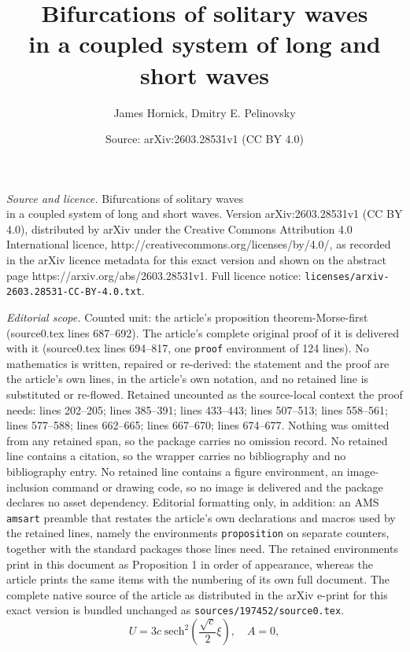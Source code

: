 \documentclass[10pt,a4paper]{amsart}
\title{Bifurcations of solitary waves \\ in a coupled system of long and short waves}
\author{James Hornick, Dmitry E. Pelinovsky}
\date{Source: arXiv:2603.28531v1 (CC BY 4.0)}
\begin{document}
\maketitle

\noindent\emph{Source and licence.} Bifurcations of solitary waves \\ in a coupled system of long and short waves. Version arXiv:2603.28531v1 (CC BY 4.0), distributed by arXiv under the Creative Commons Attribution 4.0 International licence, http://creativecommons.org/licenses/by/4.0/, as recorded in the arXiv licence metadata for this exact version and shown on the abstract page https://arxiv.org/abs/2603.28531v1. Full licence notice: \texttt{licenses/arxiv-2603.28531-CC-BY-4.0.txt}.\par\smallskip

\noindent\textit{Editorial scope.} Counted unit: the article's proposition theorem-Morse-first (source0.tex lines 687--692). The article's complete original proof of it is delivered with it (source0.tex lines 694--817, one \texttt{proof} environment of 124 lines). No mathematics is written, repaired or re-derived: the statement and the proof are the article's own lines, in the article's own notation, and no retained line is substituted or re-flowed.  Retained uncounted as the source-local context the proof needs: lines 202--205; lines 385--391; lines 433--443; lines 507--513; lines 558--561; lines 577--588; lines 662--665; lines 667--670; lines 674--677.  Nothing was omitted from any retained span, so the package carries no omission record.  No retained line contains a citation, so the wrapper carries no bibliography and no bibliography entry.  No retained line contains a figure environment, an image-inclusion command or drawing code, so no image is delivered and the package declares no asset dependency.  Editorial formatting only, in addition: an AMS \texttt{amsart} preamble that restates the article's own declarations and macros used by the retained lines, namely the environments \texttt{proposition} on separate counters, together with the standard packages those lines need.  The retained environments print in this document as Proposition 1 in order of appearance, whereas the article prints the same items with the numbering of its own full document.  The complete native source of the article as distributed in the arXiv e-print for this exact version is bundled unchanged as \texttt{sources/197452/source0.tex}.
\begin{equation}
\label{solution-1}
U = 3 c \; \text{sech}^2\left(\frac{\sqrt{c}}{2}\xi\right), \quad A=0,
\end{equation}
\end{document}
